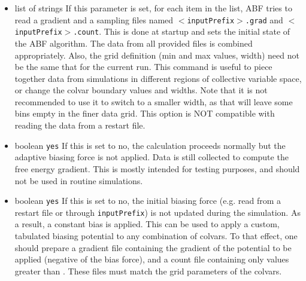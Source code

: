 \begin{itemize}
\item %
  {list of strings}
  {If this parameter is set, for each item in the list, ABF tries to read
    a gradient and a sampling files named \texttt{$<$inputPrefix$>$.grad}
    and \texttt{$<$inputPrefix$>$.count}. This is done at
    startup and sets the initial state of the ABF algorithm.
    The data from all provided files is combined appropriately.
    Also, the grid definition (min and max values, width) need not be the same
    that for the current run. This command is useful to piece together
    data from simulations in different regions of collective variable space,
    or change the colvar boundary values and widths. Note that it is not
    recommended to use it to switch to a smaller width, as that will leave
    some bins empty in the finer data grid.
    This option is NOT compatible with reading the data from a restart file.}

\item {}
  {boolean}
  {\texttt{yes}}
  { If this is set to no, the calculation proceeds normally but the adaptive
    biasing force is not applied. Data is still collected to compute
    the free energy gradient. This is mostly intended for testing purposes, and should
    not be used in routine simulations.
  }

\item {}
  {boolean}
  {\texttt{yes}}
  { If this is set to no, the initial biasing force (e.g. read from a restart file or
    through \texttt{inputPrefix}) is not updated during the simulation.
    As a result, a constant bias is applied. This can be used to apply a custom, tabulated
    biasing potential to any combination of colvars. To that effect, one should prepare
    a gradient file containing the gradient of the potential to be applied (negative
    of the bias force), and a count file containing only values greater than
    . These files must match the grid parameters of the colvars.
  }
\end{itemize}

\label{sec:mw-ABF}

